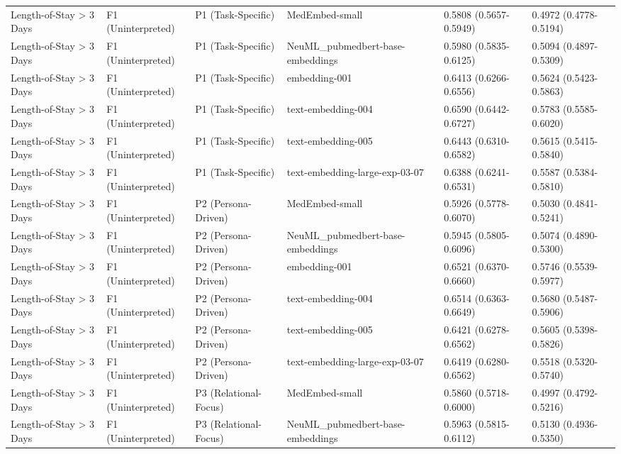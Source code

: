 \begin{tabular}{llllll}
Length-of-Stay \textgreater{} 3 Days & F1 (Uninterpreted) & P1 (Task-Specific) & MedEmbed-small & 0.5808 (0.5657-0.5949) & 0.4972 (0.4778-0.5194) \\
Length-of-Stay \textgreater{} 3 Days & F1 (Uninterpreted) & P1 (Task-Specific) & NeuML\_pubmedbert-base-embeddings & 0.5980 (0.5835-0.6125) & 0.5094 (0.4897-0.5309) \\
Length-of-Stay \textgreater{} 3 Days & F1 (Uninterpreted) & P1 (Task-Specific) & embedding-001 & 0.6413 (0.6266-0.6556) & 0.5624 (0.5423-0.5863) \\
Length-of-Stay \textgreater{} 3 Days & F1 (Uninterpreted) & P1 (Task-Specific) & text-embedding-004 & 0.6590 (0.6442-0.6727) & 0.5783 (0.5585-0.6020) \\
Length-of-Stay \textgreater{} 3 Days & F1 (Uninterpreted) & P1 (Task-Specific) & text-embedding-005 & 0.6443 (0.6310-0.6582) & 0.5615 (0.5415-0.5840) \\
Length-of-Stay \textgreater{} 3 Days & F1 (Uninterpreted) & P1 (Task-Specific) & text-embedding-large-exp-03-07 & 0.6388 (0.6241-0.6531) & 0.5587 (0.5384-0.5810) \\
Length-of-Stay \textgreater{} 3 Days & F1 (Uninterpreted) & P2 (Persona-Driven) & MedEmbed-small & 0.5926 (0.5778-0.6070) & 0.5030 (0.4841-0.5241) \\
Length-of-Stay \textgreater{} 3 Days & F1 (Uninterpreted) & P2 (Persona-Driven) & NeuML\_pubmedbert-base-embeddings & 0.5945 (0.5805-0.6096) & 0.5074 (0.4890-0.5300) \\
Length-of-Stay \textgreater{} 3 Days & F1 (Uninterpreted) & P2 (Persona-Driven) & embedding-001 & 0.6521 (0.6370-0.6660) & 0.5746 (0.5539-0.5977) \\
Length-of-Stay \textgreater{} 3 Days & F1 (Uninterpreted) & P2 (Persona-Driven) & text-embedding-004 & 0.6514 (0.6363-0.6649) & 0.5680 (0.5487-0.5906) \\
Length-of-Stay \textgreater{} 3 Days & F1 (Uninterpreted) & P2 (Persona-Driven) & text-embedding-005 & 0.6421 (0.6278-0.6562) & 0.5605 (0.5398-0.5826) \\
Length-of-Stay \textgreater{} 3 Days & F1 (Uninterpreted) & P2 (Persona-Driven) & text-embedding-large-exp-03-07 & 0.6419 (0.6280-0.6562) & 0.5518 (0.5320-0.5740) \\
Length-of-Stay \textgreater{} 3 Days & F1 (Uninterpreted) & P3 (Relational-Focus) & MedEmbed-small & 0.5860 (0.5718-0.6000) & 0.4997 (0.4792-0.5216) \\
Length-of-Stay \textgreater{} 3 Days & F1 (Uninterpreted) & P3 (Relational-Focus) & NeuML\_pubmedbert-base-embeddings & 0.5963 (0.5815-0.6112) & 0.5130 (0.4936-0.5350) \\

\end{tabular}
